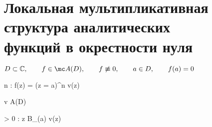 \section{Локальная мультипликативная структура аналитических \tpst\\{}функций в окрестности нуля}

\begin{theorem}
	$ D \sub \Co, \qquad f \in \mc A(D), \qquad f \not\equiv 0, \qquad a \in D, \qquad f(a) = 0 $
	\begin{equ}{15}
		\implies \exist n \in \N : \quad f(z) = (z = a)^n v(z)
	\end{equ}
	\begin{equ}{16}
		 v \in \mc A(D)
	\end{equ}
	\begin{equ}{17}
		 \exist \delta > 0 : \quad \forall z \in \ttm B_\delta(a) \quad v(z) 
	\end{equ}
\end{theorem}

